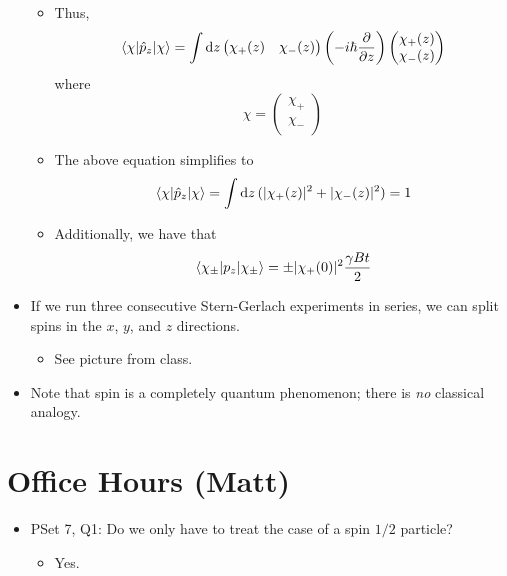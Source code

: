 \documentclass[../notes.tex]{subfiles}
\begin{document}
\begin{itemize}
\begin{itemize}
        \item Thus,
        \begin{equation*}
            \ev{\hat{p}_z}{\chi} = \int\dd{z}
            \begin{pmatrix}
                \chi_+(z) & \chi_-(z)\\
            \end{pmatrix}
            \left( -i\hbar\pdv{z} \right)
            \begin{pmatrix}
                \chi_+(z)\\
                \chi_-(z)\\
            \end{pmatrix}
        \end{equation*}
        where
        \begin{equation*}
            \chi =
            \begin{pmatrix}
                \chi_+\\
                \chi_-\\
            \end{pmatrix}
        \end{equation*}
        \item The above equation simplifies to
        \begin{equation*}
            \ev{\hat{p}_z}{\chi} = \int\dd{z}(|\chi_+(z)|^2+|\chi_-(z)|^2)
            = 1
        \end{equation*}
        \item Additionally, we have that
        \begin{equation*}
            \ev{p_z}{\chi_\pm} = \pm|\chi_+(0)|^2\frac{\gamma Bt}{2}
        \end{equation*}
    \end{itemize}
    \item If we run three consecutive Stern-Gerlach experiments in series, we can split spins in the $x$, $y$, and $z$ directions.
    \begin{itemize}
        \item See picture from class.
    \end{itemize}
    \item Note that spin is a completely quantum phenomenon; there is \emph{no} classical analogy.
\end{itemize}



\section{Office Hours (Matt)}
\begin{itemize}
    \item PSet 7, Q1: Do we only have to treat the case of a spin $1/2$ particle?
    \begin{itemize}
        \item Yes.
    \end{itemize}
\end{itemize}
\end{document}
